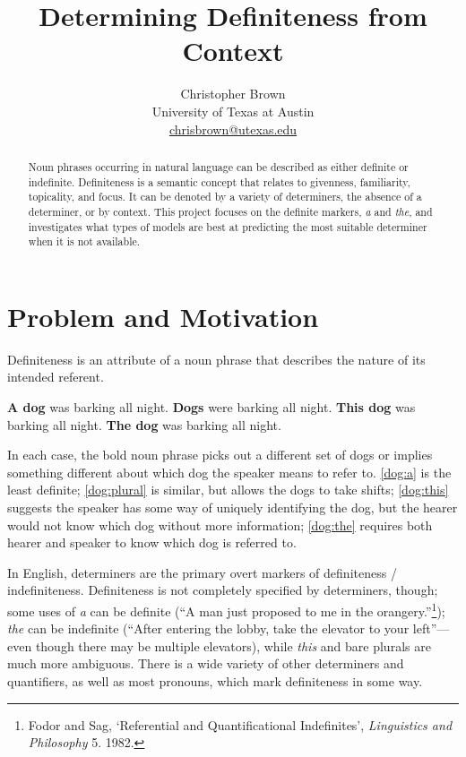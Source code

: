 \documentclass[11pt]{article}
\title{Determining Definiteness from Context}
\author{Christopher Brown\\
University of Texas at Austin\\
\href{mailto:chrisbrown@utexas.edu}{chrisbrown@utexas.edu}}
\date{}
\begin{document}
\maketitle

\begin{abstract}
\noindent
Noun phrases occurring in natural language can be described as either definite or indefinite.
Definiteness is a semantic concept that relates to givenness, familiarity, topicality, and focus.
It can be denoted by a variety of determiners, the absence of a determiner, or by context.
This project focuses on the definite markers, \emph{a} and \emph{the}, and investigates what types of models are best at predicting the most suitable determiner when it is not available.
\end{abstract}

\section{Problem and Motivation} %
Definiteness is an attribute of a noun phrase that describes the nature of its intended referent.
\begin{exe}
  \ex \textbf{A dog} was barking all night. \label{dog:a}
  \ex \textbf{Dogs} were barking all night. \label{dog:plural}
  \ex \textbf{This dog} was barking all night. \label{dog:this}
  \ex \textbf{The dog} was barking all night. \label{dog:the}
\end{exe}
In each case, the bold noun phrase picks out a different set of dogs or implies something different about which dog the speaker means to refer to. \eqref{dog:a} is the least definite; \eqref{dog:plural} is similar, but allows the dogs to take shifts; \eqref{dog:this} suggests the speaker has some way of uniquely identifying the dog, but the hearer would not know which dog without more information; \eqref{dog:the} requires both hearer and speaker to know which dog is referred to.

In English, determiners are the primary overt markers of definiteness / indefiniteness.
Definiteness is not completely specified by determiners, though; some uses of \emph{a} can be definite (``A man just proposed to me in the orangery.''\footnote{Fodor and Sag, `Referential and Quantificational Indefinites', \emph{Linguistics and Philosophy} 5. 1982.}); \emph{the} can be indefinite (``After entering the lobby, take the elevator to your left''---even though there may be multiple elevators), while \emph{this} and bare plurals are much more ambiguous. There is a wide variety of other determiners and quantifiers, as well as most pronouns, which mark definiteness in some way.
\end{document}

